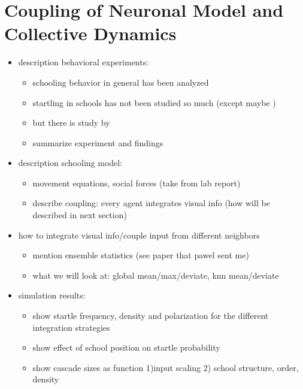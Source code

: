 \documentclass[a4paper,10pt,hidelinks]{scrreprt}
\begin{document}
	\chapter{Coupling of Neuronal Model and Collective Dynamics}
	\begin{itemize}
		\item description behavioral experiments:
		\begin{itemize}
			\item schooling behavior in general has been analyzed
			\item startling in schools has not been studied so much (except maybe 
			\cite{Fischer2015})
			\item but there is study by \cite{Rosenthal2015}
			\item summarize experiment and findings
		\end{itemize}
		\item description schooling model:
		\begin{itemize}
			\item movement equations, social forces (take from lab report)
			\item describe coupling: every agent integrates visual info (how will be described in 
			next section)
		\end{itemize}
		\item how to integrate visual info/couple input from different neighbors
		\begin{itemize}
			\item mention ensemble statistics (see paper that pawel sent me)
			\item what we will look at: global mean/max/deviate, knn mean/deviate
		\end{itemize}
		\item simulation results:
		\begin{itemize}
			\item show startle frequency, density and polarization for the different integration 
			strategies
			\item show effect of school position on startle probability
			\item show cascade sizes as function 1)input scaling 2) school structure, order, density
			
		\end{itemize}
	\end{itemize}
\end{document}
